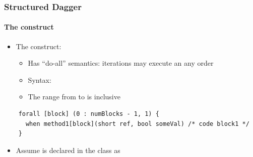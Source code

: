 \documentclass{beamer}
\begin{document}
\begin{frame}[fragile]
  \frametitle{Structured Dagger}
  \framesubtitle{The  construct}
  \begin{itemize}
  \item The  construct:
    \begin{itemize}
    \item Has ``do-all'' semantics: iterations may execute an any order
    \item Syntax: 
    \item The range from  to  is inclusive
    \end{itemize}
  \end{itemize}
  \begin{lstlisting}
    forall [block] (0 : numBlocks - 1, 1) {
      when method1[block](short ref, bool someVal) /* code block1 */
    }
  \end{lstlisting}
  \begin{itemize}
    \item Assume  is declared in the class as 
  \end{itemize}
\end{frame}

%   

%   

%   

%   

%   
\end{document}
